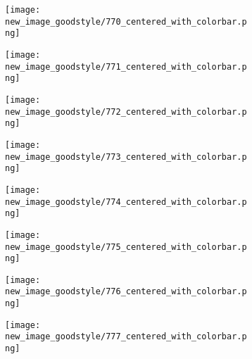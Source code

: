\documentclass[a4paper,12pt]{article}
\begin{document}
\begin{figure}[H]
  \begin{subfigure}{0.11\textwidth}
    \texttt{[image: new\_image\_goodstyle/770\_centered\_with\_colorbar.png]}
  \end{subfigure}
  \hfill
  \begin{subfigure}{0.11\textwidth}
    \texttt{[image: new\_image\_goodstyle/771\_centered\_with\_colorbar.png]}
  \end{subfigure}
  \hfill
  \begin{subfigure}{0.11\textwidth}
    \texttt{[image: new\_image\_goodstyle/772\_centered\_with\_colorbar.png]}
  \end{subfigure}
  \hfill
  \begin{subfigure}{0.11\textwidth}
    \texttt{[image: new\_image\_goodstyle/773\_centered\_with\_colorbar.png]}
  \end{subfigure}
  \hfill
  \begin{subfigure}{0.11\textwidth}
    \texttt{[image: new\_image\_goodstyle/774\_centered\_with\_colorbar.png]}
  \end{subfigure}
  \hfill
  \begin{subfigure}{0.11\textwidth}
    \texttt{[image: new\_image\_goodstyle/775\_centered\_with\_colorbar.png]}
  \end{subfigure}
  \hfill
  \begin{subfigure}{0.11\textwidth}
    \texttt{[image: new\_image\_goodstyle/776\_centered\_with\_colorbar.png]}
  \end{subfigure}
  \hfill
  \begin{subfigure}{0.11\textwidth}
    \texttt{[image: new\_image\_goodstyle/777\_centered\_with\_colorbar.png]}
  \end{subfigure}
  \hfill
\end{figure}
\end{document}
